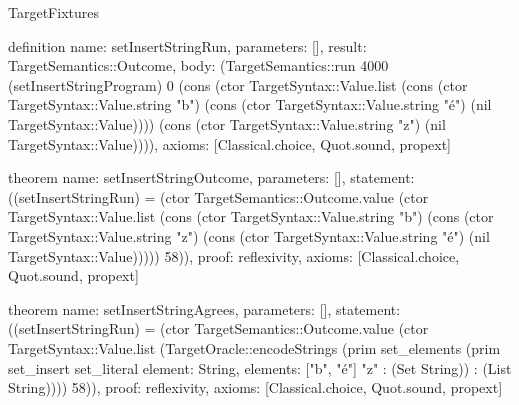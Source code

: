 \begin{lexlean}{TargetFixtures}
\begin{semanticmodule}
definition{
  name: setInsertStringRun,
  parameters: [],
  result: TargetSemantics::Outcome,
  body: (TargetSemantics::run 4000 (setInsertStringProgram) 0 (cons (ctor TargetSyntax::Value.list (cons (ctor TargetSyntax::Value.string "b") (cons (ctor TargetSyntax::Value.string "é") (nil TargetSyntax::Value)))) (cons (ctor TargetSyntax::Value.string "z") (nil TargetSyntax::Value)))),
  axioms: [Classical.choice, Quot.sound, propext]
}

theorem{
  name: setInsertStringOutcome,
  parameters: [],
  statement: ((setInsertStringRun) = (ctor TargetSemantics::Outcome.value (ctor TargetSyntax::Value.list (cons (ctor TargetSyntax::Value.string "b") (cons (ctor TargetSyntax::Value.string "z") (cons (ctor TargetSyntax::Value.string "é") (nil TargetSyntax::Value))))) 58)),
  proof: reflexivity{},
  axioms: [Classical.choice, Quot.sound, propext]
}

theorem{
  name: setInsertStringAgrees,
  parameters: [],
  statement: ((setInsertStringRun) = (ctor TargetSemantics::Outcome.value (ctor TargetSyntax::Value.list (TargetOracle::encodeStrings (prim set_elements (prim set_insert set_literal{
    element: String,
    elements: ["b", "é"]
  } "z" : (Set String)) : (List String)))) 58)),
  proof: reflexivity{},
  axioms: [Classical.choice, Quot.sound, propext]
}


\end{semanticmodule}
\end{lexlean}
